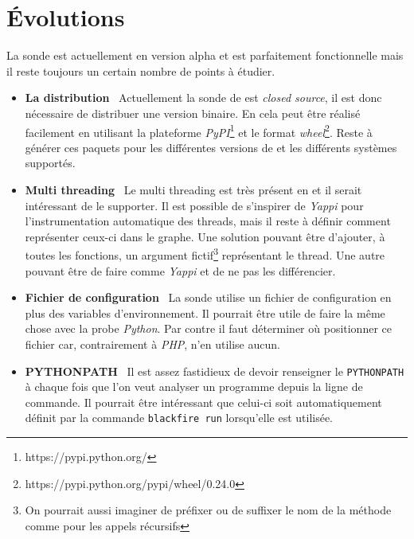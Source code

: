   \section{Évolutions}
  	
La sonde \Python est actuellement en version alpha et est parfaitement fonctionnelle mais il reste toujours un certain nombre de points à étudier.

\begin{itemize}
\item \textbf{La distribution}\;~ Actuellement la sonde de \Blackfire est \emph{\gls{closed source}}, il est donc nécessaire de distribuer une version binaire. En \Python cela peut être réalisé facilement en utilisant la plateforme \emph{PyPI}\footnote{https://pypi.python.org/} et le format \emph{wheel}\footnote{https://pypi.python.org/pypi/wheel/0.24.0}. Reste à générer ces paquets pour les différentes versions de \Python et les différents systèmes supportés.
\item \textbf{Multi threading}\;~ Le multi threading est très présent en \Python et il serait intéressant de le supporter. Il est possible de s'inspirer de \emph{Yappi} pour l'instrumentation automatique des threads, mais il reste à définir comment représenter ceux-ci dans le graphe. Une solution pouvant être d'ajouter, à toutes les fonctions, un argument fictif\footnote{On pourrait aussi imaginer de préfixer ou de suffixer le nom de la méthode comme pour les appels récursifs} représentant le thread. Une autre pouvant être de faire comme \emph{Yappi} et de ne pas les différencier.
\item \textbf{Fichier de configuration}\;~ La sonde \PHP utilise un fichier de configuration en plus des variables d'environnement. Il pourrait être utile de faire la même chose avec la probe \emph{Python}. Par contre il faut déterminer où positionner ce fichier car, contrairement à \emph{PHP}, \Python n'en utilise aucun.
\item \textbf{PYTHONPATH}\;~ Il est assez fastidieux de devoir renseigner le \verb|PYTHONPATH| à chaque fois que l'on veut analyser un programme depuis la ligne de commande. Il pourrait être intéressant que celui-ci soit automatiquement définit par la commande \verb|blackfire run| lorsqu'elle est utilisée.
\end{itemize}
  	
